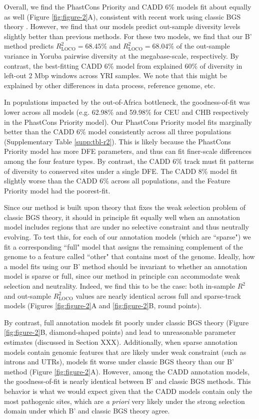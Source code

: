\documentclass[11pt]{article}
\begin{document}
Overall, we find the PhastCons Priority and CADD 6\% models fit about equally
as well (Figure \ref{fig:figure-2}A), consistent with recent work using classic
BGS theory \parencite{Murphy2022-sj}. However, we find that our models predict
out-sample diversity levels slightly better than previous methods. For these
two models, we find that our B' method predicts $R_\text{LOCO}^2=68.45$\% and
$R_\text{LOCO}^2=68.04$\% of the out-sample variance in Yoruba pairwise
diversity at the megabase-scale, respectively. By contrast, the best-fitting
CADD 6\% model from \textcite{Murphy2022-sj} explained 60\% of diversity in
left-out 2 Mbp windows across YRI samples. We note that this might be explained
by other differences in data process, reference genome, etc.

In populations impacted by the out-of-Africa bottleneck, the goodness-of-fit
was lower across all models (e.g. 62.98\% and 59.98\% for CEU and CHB
respectively in the PhastCons Priority model). Our PhastCons Priority model
fits marginally better than the CADD 6\% model consistently across all three
populations (Supplementary Table \ref{supp:tbl-r2}). This is likely because the
PhastCons Priority model has more DFE parameters, and thus can fit finer-scale
differences among the four feature types. By contrast, the CADD 6\% track must
fit patterns of diversity to conserved sites under a single DFE. The CADD 8\%
model fit slightly worse than the CADD 6\% across all populations, and the
Feature Priority model had the poorest-fit.

Since our method is built upon theory that fixes the weak selection problem of
classic BGS theory, it should in principle fit equally well when an annotation
model includes regions that are under no selective constraint and thus
neutrally evolving. To test this, for each of our annotation models (which are
``sparse") we fit a corresponding ``full" model that assigns the remaining
complement of the genome to a feature called ``other" that contains most of the
genome. Ideally, how a model fits using our B' method should be invariant to
whether an annotation model is sparse or full, since our method in principle
can accommodate weak selection and neutrality. Indeed, we find this to be the
case: both in-sample $R^2$ and out-sample $R_\text{LOCO}^2$ values are nearly
identical across full and sparse-track models (Figures \ref{fig:figure-2}A and
\ref{fig:figure-2}B, round points). 

By contrast, full annotation models fit poorly under classic BGS theory (Figure
\ref{fig:figure-2}B, diamond-shaped points) and lead to unreasonable parameter
estimates (discussed in Section XXX). Additionally, when sparse annotation
models contain genomic features that are likely under weak constraint (such as
introns and UTRs), models fit worse under classic BGS theory than our B' method
(Figure \ref{fig:figure-2}A). However, among the CADD annotation models, the
goodness-of-fit is nearly identical between B' and classic BGS methods. This
behavior is what we would expect given that the CADD models contain only the
most pathogenic sites, which are \emph{a priori} very likely under the strong
selection domain under which B' and classic BGS theory agree.
\end{document}
